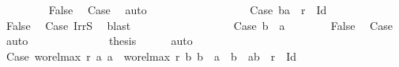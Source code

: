 \begin{isabellebody}
\ \ \ \ \ \ \ \isamarkupfalse%
\ False\ \isamarkupfalse%
\ Case{}\ \isamarkupfalse%
\ auto\isanewline
\ \ \ \ \ \isacommand{{\isacharbraceright}{\kern0pt}}\isamarkupfalse%
\isanewline
\ \ \ \ \ \isamarkupfalse%
\isanewline
\ \ \ \ \ \isacommand{{\isacharbraceleft}{\kern0pt}}\isamarkupfalse%
\isamarkupfalse%
\ Case{}{}{\isacharcolon}{\kern0pt}\ {\isachardoublequoteopen}{\isacharparenleft}{\kern0pt}b{}{\isacharcomma}{\kern0pt}a{}{\isacharparenright}{\kern0pt}\ {\isasymin}\ r\ {\isacharminus}{\kern0pt}\ Id{\isachardoublequoteclose}\isanewline
\ \ \ \ \ \ \isamarkupfalse%
\ False\ \isamarkupfalse%
\ Case{}\ IrrS\ \isamarkupfalse%
\ blast\isanewline
\ \ \ \ \ \isacommand{{\isacharbraceright}{\kern0pt}}\isamarkupfalse%
\isanewline
\ \ \ \ \ \isamarkupfalse%
\isanewline
\ \ \ \ \ \isacommand{{\isacharbraceleft}{\kern0pt}}\isamarkupfalse%
\isamarkupfalse%
\ Case{}{}{\isacharcolon}{\kern0pt}\ {\isachardoublequoteopen}b{}\ {\isacharequal}{\kern0pt}\ a{}{\isachardoublequoteclose}\isanewline
\ \ \ \ \ \ \isamarkupfalse%
\ False\ \isamarkupfalse%
\ Case{}\ \isamarkupfalse%
\ auto\isanewline
\ \ \ \ \ \isacommand{{\isacharbraceright}{\kern0pt}}\isamarkupfalse%
\isanewline
\ \ \ \ \ \isamarkupfalse%
\ \isamarkupfalse%
\ {\isacharquery}{\kern0pt}thesis\ \isamarkupfalse%
\ {}\ {}\ \isamarkupfalse%
\ auto\isanewline
\ \ \ \ \isacommand{{\isacharbraceright}{\kern0pt}}\isamarkupfalse%
\isanewline
\ \ \ \ \isamarkupfalse%
\isanewline
\ \ \ \ \isacommand{{\isacharbraceleft}{\kern0pt}}\isamarkupfalse%
\isamarkupfalse%
\ Case{}{\isacharcolon}{\kern0pt}\ {\isachardoublequoteopen}wo{\isacharunderscore}{\kern0pt}rel{\isachardot}{\kern0pt}max{}\ r\ a{}\ a{}\ {\isacharequal}{\kern0pt}\ wo{\isacharunderscore}{\kern0pt}rel{\isachardot}{\kern0pt}max{}\ r\ b{}\ b{}\ {\isasymand}\ a{}\ {\isacharequal}{\kern0pt}\ b{}\ {\isasymand}\ {\isacharparenleft}{\kern0pt}a{}{\isacharcomma}{\kern0pt}b{}{\isacharparenright}{\kern0pt}\ {\isasymin}\ r\ {\isacharminus}{\kern0pt}\ Id{\isachardoublequoteclose}\isanewline

\end{isabellebody}
